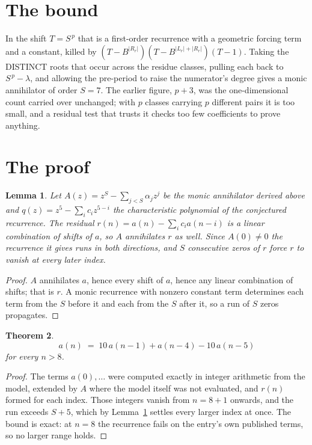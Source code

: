 \documentclass[11pt,a4paper]{article}
\theoremstyle{plain}
\newtheorem{theorem}{Theorem}
\newtheorem{lemma}[theorem]{Lemma}
\theoremstyle{definition}
\begin{document}
\section{The bound}

In the shift $T=S^{\,p}$ that is a first-order recurrence with a geometric forcing term and a
constant, killed by $(T-B^{|R_r|})(T-B^{|L_r|+|R_r|})(T-1)$. Taking the DISTINCT roots that
occur across the residue classes, pulling each back to $S^{\,p}-\lambda$, and allowing the
pre-period to raise the numerator's degree gives a monic annihilator of order $S=7$. The
earlier figure, $p+3$, was the one-dimensional count carried over unchanged; with $p$ classes
carrying $p$ different pairs it is too small, and a residual test that trusts it checks too few
coefficients to prove anything.

\section{The proof}

\begin{lemma}\label{lem:crit}
Let $A(z)=z^S-\sum_{j<S}\alpha_jz^{j}$ be the monic annihilator derived above and
$q(z)=z^{5}-\sum_ic_iz^{5-i}$ the characteristic polynomial of the conjectured
recurrence. The residual $r(n)=a(n)-\sum_ic_ia(n-i)$ is a linear combination of shifts of $a$,
so $A$ annihilates $r$ as well. Since $A(0)\ne0$ the recurrence it gives runs in both
directions, and $S$ consecutive zeros of $r$ force $r$ to vanish at every later index.
\end{lemma}

\begin{proof}
$A$ annihilates $a$, hence every shift of $a$, hence any linear combination of shifts; that is
$r$. A monic recurrence with nonzero constant term determines each term from the $S$ before it
and each from the $S$ after it, so a run of $S$ zeros propagates.
\end{proof}

\begin{theorem}
\[
a(n)\;=\;10\,a(n-1) + a(n-4) - 10\,a(n-5)
\]
for every $n>8$.
\end{theorem}

\begin{proof}
The terms $a(0),\dots$ were computed exactly in integer arithmetic from the model, extended by
$A$ where the model itself was not evaluated, and $r(n)$ formed for each index. Those integers
vanish from $n=8+1$ onwards, and the run exceeds $S+5$, which by
Lemma~\ref{lem:crit} settles every larger index at once. The bound is exact: at $n=8$ the recurrence fails on the entry's own published terms, so no larger range holds.
\end{proof}
\end{document}
